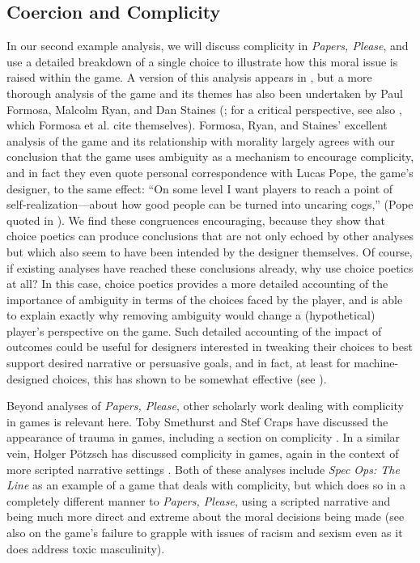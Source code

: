 \documentclass[arts,article,submit,moreauthors,pdftex,10pt,a4paper]{Definitions/mdpi}
\begin{document}
\subsection{Coercion and Complicity}

In our second example analysis, we will discuss complicity in \emph{Papers, Please}, and use a detailed breakdown of a single choice to illustrate how this moral issue is raised within the game.
%
A version of this analysis appears in \citep{mawhorter2016artificial}, but a more thorough analysis of the game and its themes has also been undertaken by 
Paul Formosa, Malcolm Ryan, and Dan Staines (\citeyear{formosa2016papers}; for a critical perspective, see also \cite{alexander2013designing}, which Formosa et al. cite themselves).
%
Formosa, Ryan, and Staines' excellent analysis of the game and its relationship with morality largely agrees with our conclusion that the game uses ambiguity as a mechanism to encourage complicity, and in fact they even quote personal correspondence with Lucas Pope, the game's designer, to the same effect: ``On some level I want players to reach a point of self-realization---about how good people can be turned into uncaring cogs,'' (Pope quoted in \cite{formosa2016papers}).
%
We find these congruences encouraging, because they show that choice poetics can produce conclusions that are not only echoed by other analyses but which also seem to have been intended by the designer themselves.
%
Of course, if existing analyses have reached these conclusions already, why use choice poetics at all?
%
In this case, choice poetics provides a more detailed accounting of the importance of ambiguity in terms of the choices faced by the player, and is able to explain exactly why removing ambiguity would change a (hypothetical) player's perspective on the game.
%
Such detailed accounting of the impact of outcomes could be useful for designers interested in tweaking their choices to best support desired narrative or persuasive goals, and in fact, at least for machine-designed choices, this has shown to be somewhat effective (see \cite{mawhorter2015intentionally}).



Beyond analyses of \emph{Papers, Please}, other scholarly work dealing with complicity in games is relevant here.
%
Toby Smethurst and Stef Craps have discussed the appearance of trauma in games, including a section on complicity \citep{smethurst2015playing}.
%
In a similar vein, Holger Pötzsch has discussed complicity in games, again in the context of more scripted narrative settings \citep{potzsch2017selective}.
%
Both of these analyses include \emph{Spec Ops: The Line} \citep{yager2012spec} as an example of a game that deals with complicity, but which does so in a completely different manner to \emph{Papers, Please}, using a scripted narrative and being much more direct and extreme about the moral decisions being made (see also \cite{murray2016race} on the game's failure to grapple with issues of racism and sexism even as it does address toxic masculinity).
\end{document}
